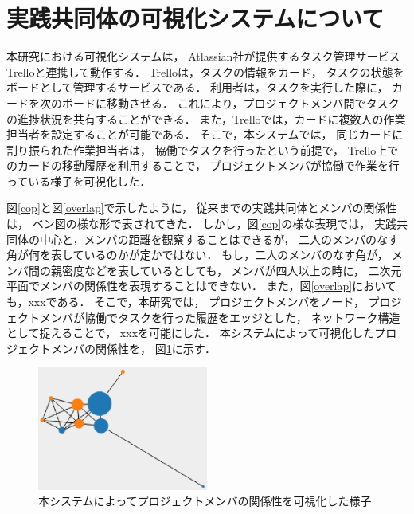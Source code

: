 \documentclass[submit,techrep]{ipsj}
\begin{document}

\section{実践共同体の可視化システムについて}
\label{system-map}

本研究における可視化システムは，
Atlassian社が提供するタスク管理サービスTrello\cite{trello}と連携して動作する．
Trelloは，タスクの情報をカード，
タスクの状態をボードとして管理するサービスである．
利用者は，タスクを実行した際に，
カードを次のボードに移動させる．
これにより，プロジェクトメンバ間でタスクの進捗状況を共有することができる．
また，Trelloでは，カードに複数人の作業担当者を設定することが可能である．
そこで，本システムでは，
同じカードに割り振られた作業担当者は，
協働でタスクを行ったという前提で，
Trello上でのカードの移動履歴を利用することで，
プロジェクトメンバが協働で作業を行っている様子を可視化した．

図\ref{cop}と図\ref{overlap}で示したように，
従来までの実践共同体とメンバの関係性は，
ベン図の様な形で表されてきた．
しかし，図\ref{cop}の様な表現では，
実践共同体の中心と，メンバの距離を観察することはできるが，
二人のメンバのなす角が何を表しているのかが定かではない．
もし，二人のメンバのなす角が，
メンバ間の親密度などを表しているとしても，
メンバが四人以上の時に，
二次元平面でメンバの関係性を表現することはできない．
また，図\ref{overlap}においても，xxxである．
そこで，本研究では，
プロジェクトメンバをノード，
プロジェクトメンバが協働でタスクを行った履歴をエッジとした，
ネットワーク構造として捉えることで，
xxxを可能にした．
本システムによって可視化したプロジェクトメンバの関係性を，
図\ref{cop-map-graph}に示す．

\begin{figure}[h]
  \centering
  \includegraphics[width=0.5\textwidth]{img/cop-map-graph.eps}
  \caption{本システムによってプロジェクトメンバの関係性を可視化した様子}
  \label{cop-map-graph}
\end{figure}
\end{document}
